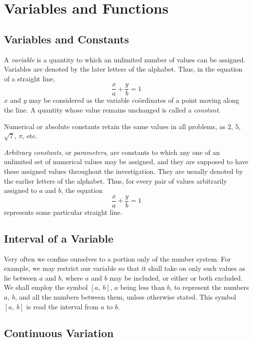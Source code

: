 \chapter{Variables and Functions}
\label{ch:02}

\section{Variables and Constants}
\label{sec:02:01}

A \emph{variable} is a quantity to which an unlimited number of values can be
assigned. Variables are denoted by the later letters of the alphabet. Thus, in
the equation of a straight line,
\[
\frac{x}{a} + \frac{y}{b} = 1
\]
$x$ and $y$ may be considered as the variable co\"ordinates of a point moving
along the line. A quantity whose value remains unchanged is called a
\emph{constant}.

Numerical or absolute constants retain the same values in all problems, as $2$,
$5$, $\sqrt{7}$, $\pi$, etc.

\emph{Arbitrary constants}, or \emph{parameters}, are constants to which any
one of an unlimited set of numerical values may be assigned, and they are
supposed to have these assigned values throughout the investigation. They are
usually denoted by the earlier letters of the alphabet. Thus, for every pair of
values arbitrarily assigned to $a$ and $b$, the equation
\[
\frac{x}{a} + \frac{y}{b} = 1
\]
represents some particular straight line.

\section{Interval of a Variable}
\label{sec:02:02}

Very often we confine ourselves to a portion only of the number system. For
example, we may restrict our variable so that it shall take on only such values
as lie between $a$ and $b$, where $a$ and $b$ may be included, or either or
both excluded. We shall employ the symbol $\left \lbrack a,\ b \right \rbrack$,
$a$ being less than $b$, to represent the numbers $a,\ b$, and all the numbers
between them, unless otherwise stated. This symbol
$\left \lbrack a,\ b \right \rbrack$ is read the interval from $a$ to $b$.

\section{Continuous Variation}
\label{sec:02:03}

